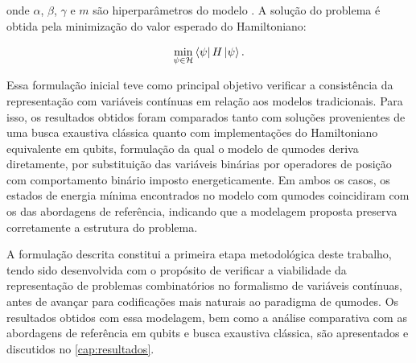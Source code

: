    \noindent onde $\alpha$, $\beta$, $\gamma$ e $m$ são hiperparâmetros do modelo \cite{lucas2014ising}. A solução do problema é obtida pela minimização do valor esperado do Hamiltoniano:

    \begin{equation}
    \min_{\psi \in \mathcal{H}} \bra{\psi} H \ket{\psi}.
    \end{equation}

    Essa formulação inicial teve como principal objetivo verificar a consistência da representação com variáveis contínuas em relação aos modelos tradicionais. Para isso, os resultados obtidos foram comparados tanto com soluções provenientes de uma busca exaustiva clássica quanto com implementações do Hamiltoniano equivalente em qubits, formulação da qual o modelo de qumodes deriva diretamente, por substituição das variáveis binárias por operadores de posição com comportamento binário imposto energeticamente. Em ambos os casos, os estados de energia mínima encontrados no modelo com qumodes coincidiram com os das abordagens de referência, indicando que a modelagem proposta preserva corretamente a estrutura do problema.

    A formulação descrita constitui a primeira etapa metodológica deste trabalho, tendo sido desenvolvida com o propósito de verificar a viabilidade da representação de problemas combinatórios no formalismo de variáveis contínuas, antes de avançar para codificações mais naturais ao paradigma de qumodes. Os resultados obtidos com essa modelagem, bem como a análise comparativa com as abordagens de referência em qubits e busca exaustiva clássica, são apresentados e discutidos no \autoref{cap:resultados}.
    
    